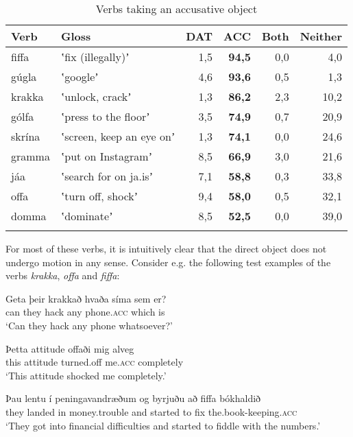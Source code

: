\documentclass[output=paper,modfonts,nonflat]{langsci/langscibook}
\begin{document}
\begin{table}
{\caption{\label{tab:jonsson:3}Verbs taking an accusative object} }
\begin{tabularx}{\textwidth}{XXrrrr} 
\lsptoprule
Verb & Gloss & DAT & \textbf{ACC} & Both & Neither\\
\midrule 
fiffa & ʽfix (illegally)ʼ & 1,5 & \textbf{94,5} & 0,0 & 4,0\\
gúgla & ʽgoogleʼ & 4,6 & \textbf{93,6} & 0,5 & 1,3\\
krakka & ʽunlock, crackʼ & 1,3 & \textbf{86,2} & 2,3 & 10,2\\
gólfa & ʽpress to the floorʼ & 3,5 & \textbf{74,9} & 0,7 & 20,9\\
skrína & ʽscreen, keep an eye onʼ & 1,3 & \textbf{74,1} & 0,0 & 24,6\\
gramma & ʽput on Instagramʼ & 8,5 & \textbf{66,9} & 3,0 & 21,6\\
jáa & ʽsearch for on ja.isʼ & 7,1 & \textbf{58,8} & 0,3 & 33,8\\
offa & ʽturn off, shockʼ & 9,4 & \textbf{58,0} & 0,5 & 32,1\\
domma & ʽdominateʼ & 8,5 & \textbf{52,5} & 0,0 & 39,0\\
\lspbottomrule
\end{tabularx}
\end{table}

For most of these verbs, it is intuitively clear that the direct object does not undergo motion in any sense. Consider e.g. the following test examples of the verbs \textit{krakka}, \textit{offa} and \textit{fiffa}:

 
\ea%
    \label{ex:jonsson:5} 
\ea
\gll  Geta  þeir  krakkað  hvaða  síma  sem  er?\\
   can  they  hack  any  phone.\textsc{acc}  which  is\\
\glt `Can they hack any phone whatsoever?'
 
\ex
\gll   Þetta  attitude  offaði  mig   alveg\\
 this  attitude  turned.off  me.\textsc{acc}   completely\\
   \glt`This attitude shocked me completely.'
 

\ex
\gll   Þau  lentu  í  peningavandræðum  og  byrjuðu  að  fiffa  bókhaldið\\
 they  landed  in  money.trouble  and  started  to  fix  the.book-keeping.\textsc{acc}\\
\glt `They got into financial difficulties and started to fiddle with the numbers.'
\z
\z
\end{document}
